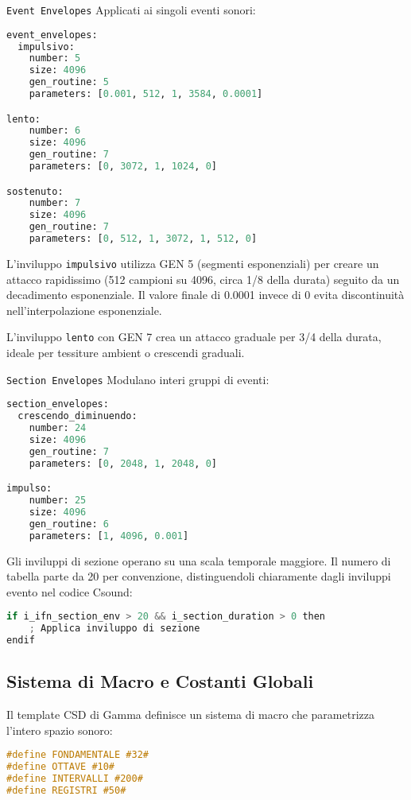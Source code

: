 \texttt{Event Envelopes} Applicati ai singoli eventi sonori:

\begin{lstlisting}[language=Python]
event_envelopes:
  impulsivo:
    number: 5
    size: 4096
    gen_routine: 5
    parameters: [0.001, 512, 1, 3584, 0.0001]

lento:
    number: 6
    size: 4096
    gen_routine: 7
    parameters: [0, 3072, 1, 1024, 0]

sostenuto:
    number: 7
    size: 4096
    gen_routine: 7
    parameters: [0, 512, 1, 3072, 1, 512, 0]
\end{lstlisting}

L'inviluppo \texttt{impulsivo} utilizza GEN 5 (segmenti esponenziali) per creare un attacco rapidissimo (512 campioni su 4096, circa 1/8 della durata) seguito da un decadimento esponenziale. Il valore finale di 0.0001 invece di 0 evita discontinuità nell'interpolazione esponenziale.

L'inviluppo \texttt{lento} con GEN 7 crea un attacco graduale per 3/4 della durata, ideale per tessiture ambient o crescendi graduali.

\texttt{Section Envelopes} Modulano interi gruppi di eventi:

\begin{lstlisting}[language=Python]
section_envelopes:
  crescendo_diminuendo:
    number: 24
    size: 4096
    gen_routine: 7
    parameters: [0, 2048, 1, 2048, 0]

impulso:
    number: 25
    size: 4096
    gen_routine: 6
    parameters: [1, 4096, 0.001]
\end{lstlisting}

Gli inviluppi di sezione operano su una scala temporale maggiore. Il numero di tabella parte da 20 per convenzione, distinguendoli chiaramente dagli inviluppi evento nel codice Csound:

\begin{lstlisting}[language=C]
if i_ifn_section_env > 20 && i_section_duration > 0 then
    ; Applica inviluppo di sezione
endif
\end{lstlisting}
\subsection{Sistema di Macro e Costanti Globali}
Il template CSD di Gamma definisce un sistema di macro che parametrizza l'intero spazio sonoro:

\begin{lstlisting}[language=C]
#define FONDAMENTALE #32#
#define OTTAVE #10#
#define INTERVALLI #200#
#define REGISTRI #50#
\end{lstlisting}
